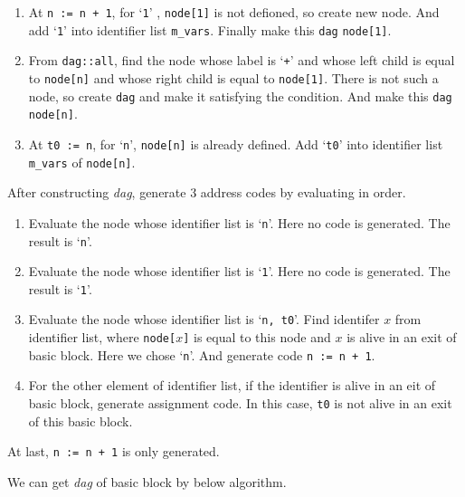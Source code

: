 \begin{Example}
\begin{enumerate}
\item At {\tt{n := n + 1}}, for `{\tt{1}}' ,
 {\tt{node[1]}} is not defioned, so create new node. And 
add `{\tt{1}}' into identifier list {\tt{m\_vars}}.
Finally make this {\tt{dag}} {\tt{node[1]}}.

\item From {\tt{dag::all}}, find the node whose label is `{\tt{+}}'
and whose left child is equal to {\tt{node[n]}}
and whose right child is equal to {\tt{node[1]}}.
There is not such a node, so create {\tt{dag}}  and
make it satisfying the condition.
And make this {\tt{dag}} {\tt{node[n]}}.

\item At {\tt{t0 := n}}, for `{\tt{n}}',
{\tt{node[n]}} is already defined.
Add `{\tt{t0}}' into identifier list {\tt{m\_vars}} of {\tt{node[n]}}.
\end{enumerate}
After constructing {\em dag}, generate 3 address codes by evaluating
in order.

\begin{enumerate}
\item Evaluate the node whose identifier list is `{\tt{n}}'.
      Here no code is generated. The result is `{\tt{n}}'.

\item Evaluate the node whose identifier list is `{\tt{1}}'.
      Here no code is generated. The result is `{\tt{1}}'.

\item Evaluate the node whose identifier list is `{\tt{n, t0}}'.
      Find identifer $x$ from identifier list, where {\tt{node[$x$]}} is equal
      to this node and $x$ is alive in an exit of basic block.
      Here we chose `{\tt{n}}'.
      And generate code {\tt{n := n + 1}}.
 
\item For the other element of identifier list, if the identifier
      is alive in an eit of basic block, generate assignment code.
      In this case, {\tt{t0}} is not alive in an exit of this
      basic block.

\end{enumerate}
At last, {\tt{n := n + 1}} is only generated.
\end{Example}

We can get {\em dag} of basic block by below algorithm.

